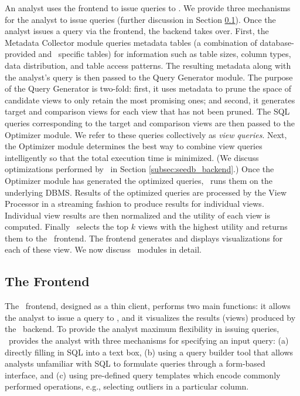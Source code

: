 An analyst uses the frontend to issue queries to \SeeDB. We provide three
mechanisms for the analyst to issue queries (further discussion in
Section \ref{subsec:seedb_frontend}).
Once the analyst issues a query via the frontend, the backend takes over.
First, the Metadata Collector module queries metadata tables (a combination of
database-provided and \SeeDB\ specific tables) for information such as table
sizes, column types, data distribution, and table access patterns.
The resulting metadata along with the analyst's query is then passed to the
Query Generator module. The purpose of the Query Generator is two-fold:
first, it uses metadata to prune the space of candidate views to only retain the
most promising ones; and second, it generates target and comparison views for
each view that has not been pruned.
The SQL queries corresponding to the target and comparison views are then passed
to the Optimizer module. We refer to these queries collectively as {\it view
queries}.
Next, the Optimizer module determines the best way to
combine view queries intelligently so that the total execution time is
minimized.
(We discuss optimizations performed by \SeeDB\ in Section
\ref{subsec:seedb_backend}.) Once the Optimizer module has generated the
optimized queries, \SeeDB\ runs them on the underlying DBMS.
Results of the optimized queries are processed by the View Processor in a
streaming fashion to produce results for individual views. Individual view
results are then normalized and the utility of each view is computed.
Finally \SeeDB\ selects the top $k$ views with the highest utility and returns
them to the \SeeDB\ frontend. The frontend generates 
and displays visualizations for each of these view. We now discuss
\SeeDB\ modules in detail.

\subsection{The Frontend}
\label{subsec:seedb_frontend}

The \SeeDB\ frontend, designed as a thin client, performs two main functions: it
allows the analyst to issue a query to \SeeDB, 
and it visualizes the results (views) produced by the \SeeDB\
backend.
To provide the analyst maximum flexibility in issuing queries, \SeeDB\
provides the analyst with three
mechanisms for specifying an input query: 
(a) directly filling in SQL into a text box, 
(b) using a query builder tool that allows analysts
unfamiliar with SQL to formulate queries through a form-based interface, and (c)
using pre-defined query templates which encode commonly performed operations,
e.g., selecting outliers in a particular column. 

